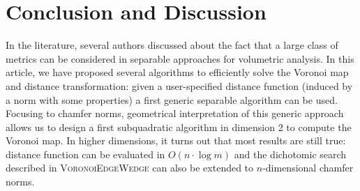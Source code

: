 \documentclass{llncs}
\begin{document}
\section{Conclusion and Discussion}
\label{sec:discussion}

In the literature, several authors discussed about the fact that a
large class of metrics can be considered in separable approaches for
volumetric analysis. In this article, we have proposed several
algorithms to efficiently solve the Voronoi map and distance
transformation: given a user-specified distance function (induced by a
norm with some properties) a first generic separable algorithm can be
used. Focusing to chamfer norms, geometrical interpretation of this
generic approach allows us to design a first subquadratic algorithm in
dimension 2 to compute the Voronoi map.  \sloppy In higher dimensions,
it turns out that most results are still true: distance function can
be evaluated in $O(n\cdot\log{m})$ and the dichotomic search described
in \textsc{VoronoiEdgeWedge} can also be extended to $n$-dimensional
chamfer norms.





\end{document}
